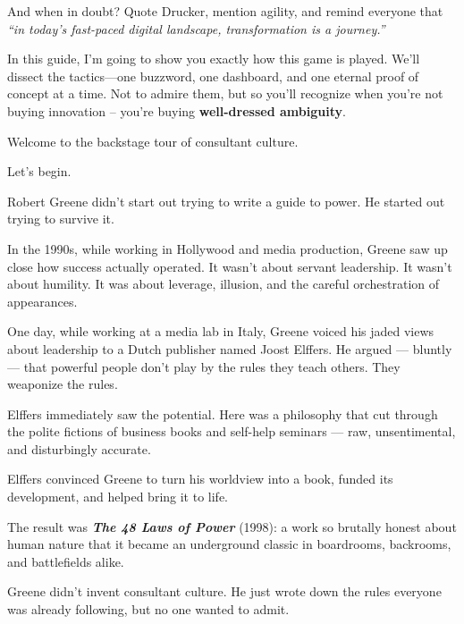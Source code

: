 And when in doubt? Quote Drucker, mention agility, and remind everyone that \textit{``in today’s fast-paced digital landscape, transformation is a journey.''}

\bigskip

In this guide, I’m going to show you exactly how this game is played. We’ll dissect the tactics—one buzzword, one dashboard, and one eternal proof of concept at a time. Not to admire them, but so you’ll recognize when you're not buying innovation -- you’re buying \textbf{well-dressed ambiguity}.

\medskip

Welcome to the backstage tour of consultant culture.

Let’s begin.

\begin{tcolorbox}[title=Historical Sidebar: How Cynicism Became a Business Model, colback=gray!5!white, colframe=black!80!white, fonttitle=\bfseries]

  Robert Greene didn’t start out trying to write a guide to power.  He started out trying to survive it.

  \medskip
  
  In the 1990s, while working in Hollywood and media production, Greene saw up close how success actually operated.  It wasn’t about servant leadership. It wasn’t about humility.  It was about leverage, illusion, and the careful orchestration of appearances.

  \medskip
  
  One day, while working at a media lab in Italy, Greene voiced his jaded views about leadership to a Dutch publisher named Joost Elffers.  He argued — bluntly — that powerful people don't play by the rules they teach others.  They weaponize the rules.

  \medskip
  
  Elffers immediately saw the potential.  Here was a philosophy that cut through the polite fictions of business books and self-help seminars — raw, unsentimental, and disturbingly accurate.

  \medskip
  
  Elffers convinced Greene to turn his worldview into a book, funded its development, and helped bring it to life.

  \medskip
  
  The result was \textbf{\textit{The 48 Laws of Power}} (1998): a work so brutally honest about human nature that it became an underground classic in boardrooms, backrooms, and battlefields alike.

  \medskip
  
  Greene didn’t invent consultant culture.  He just wrote down the rules everyone was already following, but no one wanted to admit.
  
  \end{tcolorbox}
